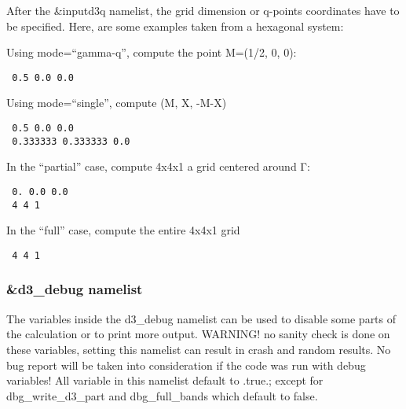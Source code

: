 \documentclass[
]{article}
\begin{document}
After the \&inputd3q namelist, the grid dimension or q-points
coordinates have to be specified. Here, are some examples taken from a
hexagonal system:

Using mode=\enquote{gamma-q}, compute the point M=(1/2, 0, 0):

\begin{verbatim}
 0.5 0.0 0.0
\end{verbatim}

Using mode=\enquote{single}, compute (M, X, -M-X)

\begin{verbatim}
 0.5 0.0 0.0
 0.333333 0.333333 0.0
\end{verbatim}

In the \enquote{partial} case, compute 4x4x1 a grid centered around Γ:

\begin{verbatim}
 0. 0.0 0.0
 4 4 1
\end{verbatim}

In the \enquote{full} case, compute the entire 4x4x1 grid

\begin{verbatim}
 4 4 1
\end{verbatim}

\hypertarget{d3_debug-namelist}{%
\subsubsection{\&d3\_debug namelist}\label{d3_debug-namelist}}

The variables inside the d3\_debug namelist can be used to disable some
parts of the calculation or to print more output. WARNING! no sanity
check is done on these variables, setting this namelist can result in
crash and random results. No bug report will be taken into consideration
if the code was run with debug variables! All variable in this namelist
default to .true.; except for dbg\_write\_d3\_part and dbg\_full\_bands
which default to false.
\end{document}
